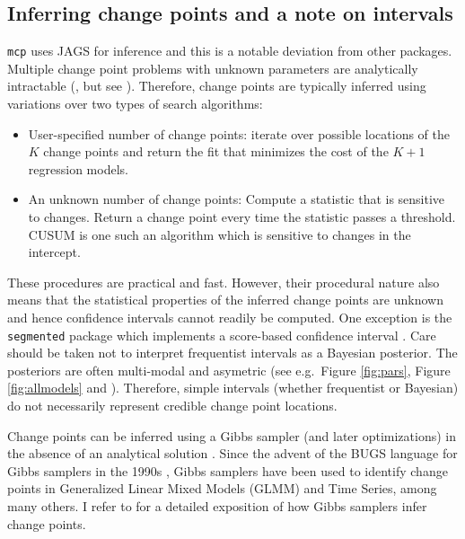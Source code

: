 \documentclass[
  american,
]{article}
\begin{document}
\hypertarget{inferring-change-points-and-a-note-on-intervals}{%
\subsection{Inferring change points and a note on intervals}\label{inferring-change-points-and-a-note-on-intervals}}

\texttt{mcp} uses JAGS \citep{plummer2003} for inference and this is a notable deviation from other packages. Multiple change point problems with unknown parameters are analytically intractable (\citep{stephens1994, carlin1992}, but see \citep{jensen2013}). Therefore, change points are typically inferred using variations over two types of search algorithms:

\begin{itemize}
\item
  User-specified number of change points: iterate over possible locations of the \(K\) change points and return the fit that minimizes the cost of the \(K+1\) regression models.
\item
  An unknown number of change points: Compute a statistic that is sensitive to changes. Return a change point every time the statistic passes a threshold. CUSUM \citep{page1954, lee2003} is one such an algorithm which is sensitive to changes in the intercept.
\end{itemize}

These procedures are practical and fast. However, their procedural nature also means that the statistical properties of the inferred change points are unknown and hence confidence intervals cannot readily be computed. One exception is the \texttt{segmented} package which implements a score-based confidence interval \citep{muggeo2017}. Care should be taken not to interpret frequentist intervals as a Bayesian posterior. The posteriors are often multi-modal and asymetric (see e.g.~Figure \ref{fig:pars}, Figure \ref{fig:allmodels} and \citep{raftery1986}). Therefore, simple intervals (whether frequentist or Bayesian) do not necessarily represent credible change point locations.

Change points can be inferred using a Gibbs sampler (and later optimizations) in the absence of an analytical solution \citep{stephens1994, carlin1992}. Since the advent of the BUGS language for Gibbs samplers in the 1990s \citep{lunn2012}, Gibbs samplers have been used to identify change points in Generalized Linear Mixed Models (GLMM) and Time Series, among many others. I refer to\citep{stephens1994, carlin1992} for a detailed exposition of how Gibbs samplers infer change points.
\end{document}
